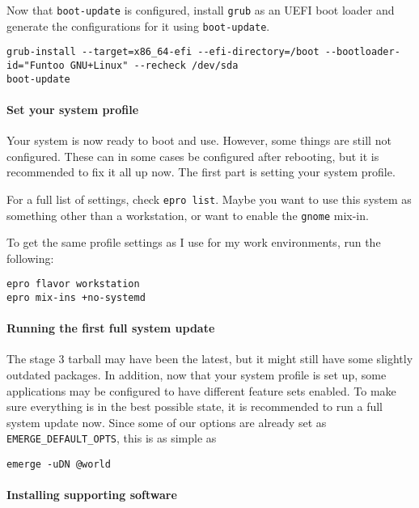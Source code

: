 Now that \texttt{boot-update} is configured, install \texttt{grub} as an
UEFI boot loader and generate the configurations for it using
\texttt{boot-update}.

\begin{verbatim}
grub-install --target=x86_64-efi --efi-directory=/boot --bootloader-id="Funtoo GNU+Linux" --recheck /dev/sda
boot-update
\end{verbatim}

\paragraph{Set your system profile}\label{set-your-system-profile}

Your system is now ready to boot and use. However, some things are still
not configured. These can in some cases be configured after rebooting,
but it is recommended to fix it all up now. The first part is setting
your system profile.

For a full list of settings, check \texttt{epro\ list}. Maybe you want
to use this system as something other than a workstation, or want to
enable the \texttt{gnome} mix-in.

To get the same profile settings as I use for my work environments, run
the following:

\begin{verbatim}
epro flavor workstation
epro mix-ins +no-systemd
\end{verbatim}

\paragraph{Running the first full system
update}\label{running-the-first-full-system-update}

The stage 3 tarball may have been the latest, but it might still have
some slightly outdated packages. In addition, now that your system
profile is set up, some applications may be configured to have different
feature sets enabled. To make sure everything is in the best possible
state, it is recommended to run a full system update now. Since some of
our options are already set as \texttt{EMERGE\_DEFAULT\_OPTS}, this is
as simple as

\begin{verbatim}
emerge -uDN @world
\end{verbatim}

\paragraph{Installing supporting
software}\label{installing-supporting-software}

